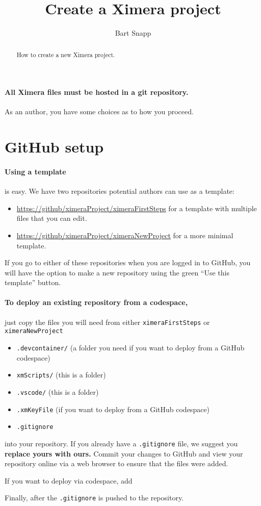 \documentclass{ximera}
\title{Create a Ximera project}
\author{Bart Snapp}
\begin{document}
\begin{abstract}
    How to create a new Ximera project.
\end{abstract}
\maketitle

\paragraph{All Ximera files must be hosted in a git repository.}
As an author, you have some choices as to how you proceed.

\section{GitHub setup}

\paragraph{Using a template} is easy.
We have two repositories potential authors can use as a template:
\begin{itemize}
    \item \url{https://github/ximeraProject/ximeraFirstSteps} for a template
          with multiple files that you can edit.
    \item \url{https://github/ximeraProject/ximeraNewProject} for a more
          minimal template.
\end{itemize}
If you go to either of these repositories when you are logged in to GitHub, you
will have the option to make a new repository using the green ``Use this
template'' button.

\paragraph{To deploy an existing repository from a codespace,} just copy the files
you will need from either \verb!ximeraFirstSteps! or \verb!ximeraNewProject!
\begin{itemize}
\item \texttt{.devcontainer/} (a folder you need if you want to deploy from a GitHub codespace)
\item \texttt{xmScripts/} (this is a folder)
\item \texttt{.vscode/} (this is a folder)
\item \texttt{.xmKeyFile} (if you want to deploy from a GitHub codespace)
\item \texttt{.gitignore} 
\end{itemize}
into your repository. If you already have a \verb|.gitignore| file, we suggest
you \textbf{replace yours with ours.} Commit your changes to GitHub and view your
repository online via a web browser to ensure that the files were added.


If you want to deploy via codespace, add


Finally, after the \verb!.gitignore! is pushed to the repository.
\end{document}
